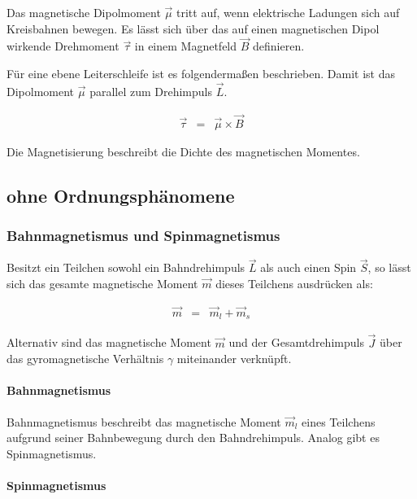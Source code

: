 \documentclass[12pt,a4paper]{scrartcl}
\numberwithin{equation}{section} %
\renewcommand{\[}{} %
\renewcommand{\]}{\noindent} %
\begin{document}
Das magnetische Dipolmoment \(\vec \mu\) tritt auf, wenn elektrische
Ladungen sich auf Kreisbahnen bewegen. Es lässt sich über das auf einen
magnetischen Dipol wirkende Drehmoment \(\vec \tau\) in einem Magnetfeld
\(\vec B\) definieren.

Für eine ebene Leiterschleife ist es folgendermaßen beschrieben. Damit
ist das Dipolmoment \(\vec \mu\) parallel zum Drehimpuls \(\vec{L}\).

\[
\begin{eqnarray}
    \vec \tau &=& \vec \mu \times \vec B
\end{eqnarray}
\]

Die Magnetisierung beschreibt die Dichte des magnetischen Momentes.

\hypertarget{ohne-ordnungsphuxe4nomene}{%
\subsection{ohne Ordnungsphänomene}\label{ohne-ordnungsphuxe4nomene}}

\hypertarget{bahnmagnetismus-und-spinmagnetismus}{%
\subsubsection{Bahnmagnetismus und
Spinmagnetismus}\label{bahnmagnetismus-und-spinmagnetismus}}

Besitzt ein Teilchen sowohl ein Bahndrehimpuls \(\vec L\) als auch einen
Spin \(\vec S\), so lässt sich das gesamte magnetische Moment
\(\vec{m}\) dieses Teilchens ausdrücken als:

\[
\begin{eqnarray}
    \vec m &=& \vec m_l + \vec m_s
\end{eqnarray}
\]

Alternativ sind das magnetische Moment \(\vec{m}\) und der
Gesamtdrehimpuls \(\vec{J}\) über das gyromagnetische Verhältnis
\(\gamma\) miteinander verknüpft.

\hypertarget{bahnmagnetismus}{%
\paragraph{Bahnmagnetismus}\label{bahnmagnetismus}}

Bahnmagnetismus beschreibt das magnetische Moment \(\vec m_l\) eines
Teilchens aufgrund seiner Bahnbewegung durch den Bahndrehimpuls. Analog
gibt es Spinmagnetismus.

\hypertarget{spinmagnetismus}{%
\paragraph{Spinmagnetismus}\label{spinmagnetismus}}
\end{document}
